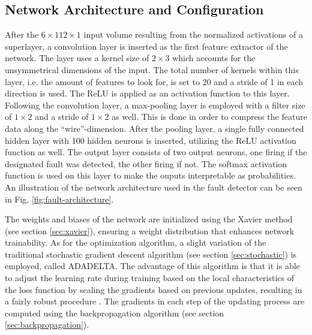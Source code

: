 \subsection{Network Architecture and Configuration}

After the \(6 \times 112 \times 1\) input volume resulting from the
normalized activations of a superlayer, a convolution layer
is inserted as the first feature extractor of the network. The layer
uses a kernel size of \(2 \times 3\) which accounts for the
unsymmetrical dimensions of the input. The total number of kernels
within this layer, i.e. the amount of features to look for, is set to
20 and a stride of 1 in each direction is used. The ReLU is applied
as an activation function to this layer.
Following the convolution layer, a max-pooling layer is employed with a
filter size of \(1 \times 2\) and a stride of \(1 \times 2\) as
well. This is done in order to compress the feature data along the
``wire''-dimension. After the pooling layer, a single fully
connected hidden layer with 100 hidden neurons is inserted, utilizing
the ReLU activation function as well. The output layer consists of two
output neurons, one firing if the designated fault was detected, the
other firing if not. The softmax activation function is used on this
layer to make the ouputs interpretable as probabilities. An
illustration of the network architecture used in the fault detector
can be seen in Fig. \ref{fig:fault-architecture}.

The weights and biases of the network are initialized using the Xavier
method (see section \ref{sec:xavier}), ensuring a weight distribution
that enhances network trainability. As for the optimization algorithm,
a slight variation of the traditional stochastic gradient
descent algorithm (see section \ref{sec:stochastic}) is employed,
called ADADELTA. The advantage of this algorithm is that it is able to
adjust the learning rate during training based on the local
characteristics of the loss function by scaling the gradients based on
previous updates, resulting in a fairly robust procedure
\cite{adadelta}. The gradients in each step of the updating process
are computed using the backpropagation algorithm (see section
\ref{sec:backpropagation}).

